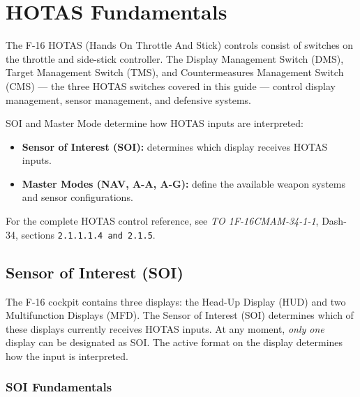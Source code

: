 \documentclass[11pt, a4paper, twoside]{report}
\newcommand{\dashrefs}[1]{\textit{TO 1F-16CMAM-34-1-1}, Dash-34, sections \texttt{#1}}
\begin{document}
\chapter{HOTAS Fundamentals}
\label{chap:C2}
The F-16 HOTAS (Hands On Throttle And Stick) controls consist of switches on the throttle and side-stick controller. The Display Management Switch (DMS), Target Management Switch (TMS), and Countermeasures Management Switch (CMS) --- the three HOTAS switches covered in this guide --- control display management, sensor management, and defensive systems.

SOI and Master Mode determine how HOTAS inputs are interpreted:

\begin{itemize}
    \item \textbf{Sensor of Interest (SOI):} determines which display receives HOTAS inputs.
    \item \textbf{Master Modes (NAV, A-A, A-G):} define the available weapon systems and sensor configurations.
\end{itemize}

For the complete HOTAS control reference, see \dashrefs{2.1.1.1.4 and 2.1.5}.

\section{Sensor of Interest (SOI)}
\label{sec:C2-S1}

The F-16 cockpit contains three displays: the Head-Up Display (HUD) and two Multifunction Displays (MFD). The Sensor of Interest (SOI) determines which of these displays currently receives HOTAS inputs. At any moment, \textit{only one} display can be designated as SOI. The active format on the display determines how the input is interpreted.

\subsection{SOI Fundamentals}
\label{sec:C2-S1-S1}
\end{document}
